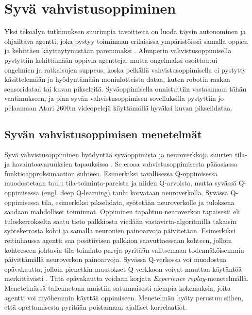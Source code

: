 \documentclass[utf8]{gradu3}
\begin{document}
\section{Syvä vahvistusoppiminen}

Yksi tekoälyn tutkimuksen suurimpia tavoitteita on luoda täysin autonominen ja ohjailtava agentti, joka pystyy toimimaan erilaisissa ympäristöissä samalla oppien ja kehittäen käyttäytymistään paremmaksi \parencite{arulkumaran2017brief}. Alunperin vahvistusoppimisella pystyttiin kehittämään oppivia agentteja, mutta ongelmaksi osoittautui ongelmien ja ratkaisujen suppeus, koska pelkällä vahvistusoppimisella ei pystytty käsittelemään ja hyödyntämään moniulotteista dataa, kuten robotin raakaa sensoridataa tai kuvan pikseleitä. Syväoppimisella onnistuttiin vastaamaan tähän vaatimukseen, ja pian syvän vahvistusoppimisen sovelluksilla pystyttiin jo pelaamaan Atari 2600:n videopelejä käyttämällä hyväksi kuvan pikselidataa.

\subsection{Syvän vahvistusoppimisen menetelmät}

Syvä vahvistusoppiminen hyödyntää syväoppimista ja neuroverkkoja suurten tila- ja havaintoavaruuksien tapauksissa \parencite{arulkumaran2017brief,li2018deep}. Se eroaa vahvistusoppimisesta pääasiassa funktioapproksimaation suhteen. Esimerkiksi tavallisessa Q-oppimisessa muodostetaan taulu tila-toiminta-pareista ja niiden Q-arvoista, mutta syvässä Q-oppimisessa (engl. deep Q-learning) taulu korvataan neuroverkolla. Syvässä Q-oppimisessa tila, esimerkiksi pikselidata, syötetään neuroverkolle ja tuloksena saadaan mahdolliset toiminnot. Oppiminen tapahtuu neuroverkon tapaisesti eli tuloskerrokselta saatu tieto palkkiosta viedään vastavirta-algoritmilla takaisin syötekerrosta kohti ja samalla neuronien painoarvoja päivitetään. Esimerkiksi reitinhaussa agentti saa positiivisen palkkion saavuttaessaan kohteen, jolloin kohteeseen johtavia tila-toiminto-pareja pyritään valitsemaan todennäköisemmin päivittämällä neuroverkon painoarvoja. Syvässä Q-verkossa voi muodostua epävakautta, jolloin pienetkin muutokset Q-verkkoon voivat muuttaa käytäntöä merkittävästi \parencite{mnih2015human}. Tätä epävakautta voidaan korjata \textit{Experience replay}-menetelmällä. Menetelmässä tallennetaan muistiin satunnaisesti aiempia kokemuksia, joita agentti voi myöhemmin käyttää oppimiseen. Menetelmän hyöty perustuu siihen, että opettamisesta pyritään poistamaan ajalliset korrelaatiot.
\end{document}

